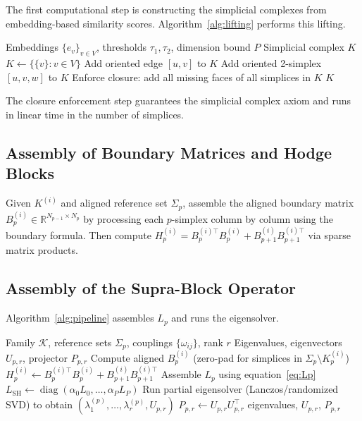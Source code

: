 \documentclass[11pt]{article}
\theoremstyle{definition}
\theoremstyle{remark}
\newcommand{\R}{\mathbb{R}}
\newcommand{\LSH}{L_{\mathrm{SH}}}
\newcommand{\Pp}{P_{p,r}}
\newcommand{\Up}{U_{p,r}}
\newcommand{\calK}{\mathcal{K}}
\DeclareMathOperator{\diag}{diag}
\DeclareMathOperator{\simop}{sim}
\DeclareMathOperator{\tri}{tri}
\begin{document}
The first computational step is constructing the simplicial complexes from
embedding-based similarity scores. Algorithm~\ref{alg:lifting} performs this
lifting.

\begin{algorithm}[h]
\caption{Simplicial Lifting}
\label{alg:lifting}
\begin{algorithmic}[1]
\Require Embeddings $\{e_v\}_{v\in V}$, thresholds $\tau_1,\tau_2$, dimension bound $P$
\Ensure Simplicial complex $K$
\State $K \gets \{\{v\}:v\in V\}$ 
  \If{$\simop(e_u,e_v) > \tau_1$}
    \State Add oriented edge $[u,v]$ to $K$
  \EndIf
\EndFor
{}
  \If{$\tri(e_u,e_v,e_w)>\tau_2$ \textbf{and} $[u,v],[u,w],[v,w]\in K$}
    \State Add oriented 2-simplex $[u,v,w]$ to $K$
  \EndIf
\EndFor
\State Enforce closure: add all missing faces of all simplices in $K$
\State \Return $K$
\end{algorithmic}
\end{algorithm}

The closure enforcement step guarantees the simplicial complex axiom and runs
in linear time in the number of simplices.

\subsection{Assembly of Boundary Matrices and Hodge Blocks}

Given $K^{(i)}$ and aligned reference set $\Sigma_p$, assemble the aligned
boundary matrix $B_p^{(i)}\in\R^{N_{p-1}\times N_p}$ by processing each
$p$-simplex column by column using the boundary formula. Then compute
$H_p^{(i)} = B_p^{(i)\top}B_p^{(i)} + B_{p+1}^{(i)}B_{p+1}^{(i)\top}$ via
sparse matrix products.

\subsection{Assembly of the Supra-Block Operator}

Algorithm~\ref{alg:pipeline} assembles $L_p$ and runs the eigensolver.

\begin{algorithm}[h]
\caption{Supra-Hodge Pipeline}
\label{alg:pipeline}
\begin{algorithmic}[1]
\Require Family $\calK$, reference sets $\Sigma_p$, couplings $\{\omega_{ij}\}$, rank $r$
\Ensure Eigenvalues, eigenvectors $\Up$, projector $\Pp$
    \State Compute aligned $B_p^{(i)}$ (zero-pad for simplices in $\Sigma_p\setminus K_p^{(i)}$)
    \State $H_p^{(i)} \gets B_p^{(i)\top}B_p^{(i)} + B_{p+1}^{(i)}B_{p+1}^{(i)\top}$
  \EndFor
\EndFor
{}
  \State Assemble $L_p$ using equation~\eqref{eq:Lp}
\EndFor
\State $\LSH \gets \diag(\alpha_0 L_0,\dots,\alpha_P L_P)$
\State Run partial eigensolver (Lanczos/randomized SVD) to obtain $(\lambda_1^{(p)},\dots,\lambda_r^{(p)},\Up)$
\State $\Pp \gets \Up\Up^\top$
\State \Return eigenvalues, $\Up$, $\Pp$
\end{algorithmic}
\end{algorithm}
\end{document}

